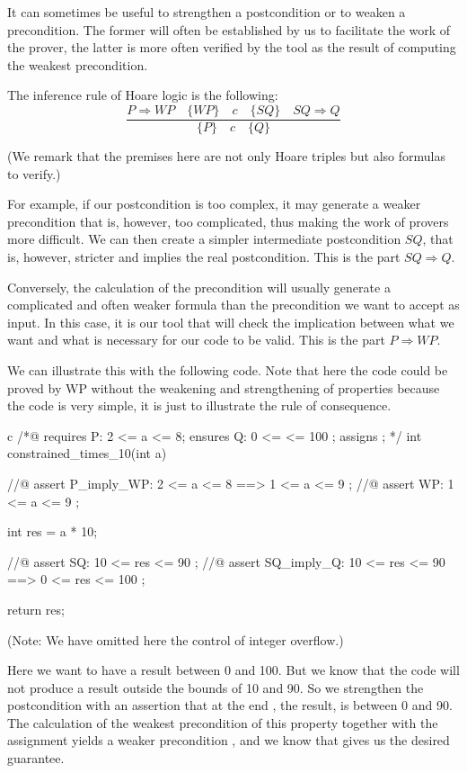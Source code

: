 It can sometimes be useful to strengthen a postcondition or to weaken a
precondition. The former will often be established by us to
facilitate the work of the prover, the latter is more often verified by
the tool as the result of computing the weakest precondition.



The inference rule of Hoare logic is the following:
$$\dfrac{P \Rightarrow WP \quad \{WP\}\quad c\quad \{SQ\} \quad SQ \Rightarrow Q}{\{P\}\quad c \quad \{Q\}}$$

(We remark that the premises here are not only Hoare triples but also
formulas to verify.)

For example, if our postcondition is too complex, it may generate a
weaker precondition that is, however, too complicated, thus making the
work of provers more difficult. We can then create a simpler
intermediate postcondition $SQ$, that is, however, stricter and
implies the real postcondition. This is the part $SQ \Rightarrow Q$.

Conversely, the calculation of the precondition will usually generate a
complicated and often weaker formula than the precondition we want to
accept as input. In this case, it is our tool that will check the
implication between what we want and what is necessary for our code to
be valid. This is the part $P \Rightarrow WP$.

We can illustrate this with the following code. Note that here the code
could be proved by WP without the weakening and strengthening of
properties because the code is very simple, it is just to illustrate the
rule of consequence.



\begin{CodeBlock}{c}
/*@
  requires P: 2 <= a <= 8;
  ensures  Q: 0 <= \result <= 100 ;
  assigns  \nothing ;
*/
int constrained_times_10(int a){
  //@ assert P_imply_WP: 2 <= a <= 8 ==> 1 <= a <= 9 ;
  //@ assert WP:         1 <= a <= 9 ;

  int res = a * 10;

  //@ assert SQ:         10 <= res <= 90 ;
  //@ assert SQ_imply_Q: 10 <= res <= 90 ==> 0 <= res <= 100 ;

  return res;
}
\end{CodeBlock}



(Note: We have omitted here the control of integer overflow.)



Here we want to have a result between 0 and 100. But we know that the
code will not produce a result outside the bounds of 10 and 90. So we
strengthen the postcondition with an assertion that at the end
, the result, is between 0 and 90. The calculation of the
weakest precondition of this property together with the assignment
 yields a weaker precondition
, and we know that
 gives us the desired
guarantee.



